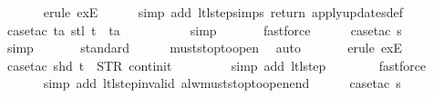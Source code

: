 \begin{isabellebody}
\ \ \ \ \ \isamarkupfalse%
\ {\isacharparenleft}erule\ exE{\isacharparenright}{\isacharplus}\isanewline
\ \ \ \ \isamarkupfalse%
\ {\isacharparenleft}simp\ add{\isacharcolon}\ ltl{\isacharunderscore}step{\isachardot}simps\ return\ apply{\isacharunderscore}updates{\isacharunderscore}def{\isacharparenright}\isanewline
\ \ \ \ \isamarkupfalse%
\ {\isacharparenleft}case{\isacharunderscore}tac\ {\isachardoublequoteopen}{\isasymexists}ta{\isachardot}\ stl\ t\ {\isacharequal}\ ta{\isachardoublequoteclose}{\isacharparenright}\isanewline
\ \ \ \ \ \ \isamarkupfalse%
\ {}\ \isamarkupfalse%
\ simp\isanewline
\ \ \ \ \ \isamarkupfalse%
\ fastforce\isanewline
\isanewline
\ \ \ \ \isamarkupfalse%
\ {\isacharparenleft}case{\isacharunderscore}tac\ {\isachardoublequoteopen}s\ {\isacharequal}\ {}{\isachardoublequoteclose}{\isacharparenright}\isanewline
\ \ \ \ \ \isamarkupfalse%
\ simp\isanewline
\ \ \ \ \ \isamarkupfalse%
\ standard\isanewline
\ \ \ \ \isamarkupfalse%
\ must{\isacharunderscore}stop{\isacharunderscore}to{\isacharunderscore}open\ \isamarkupfalse%
\ auto{\isacharbrackleft}{}{\isacharbrackright}\isanewline
\ \ \ \ \ \isamarkupfalse%
\ {\isacharparenleft}erule\ exE{\isacharparenright}{\isacharplus}\isanewline
\ \ \ \ \ \isamarkupfalse%
\ {\isacharparenleft}case{\isacharunderscore}tac\ {\isachardoublequoteopen}shd\ t\ {\isacharequal}\ {\isacharparenleft}STR\ {\isacharprime}{\isacharprime}continit{\isacharprime}{\isacharprime}{\isacharcomma}\ {\isacharbrackleft}{\isacharbrackright}{\isacharparenright}{\isachardoublequoteclose}{\isacharparenright}\isanewline
\ \ \ \ \ \ \isamarkupfalse%
\ {\isacharparenleft}simp\ add{\isacharcolon}\ ltl{\isacharunderscore}step{\isacharunderscore}{}{\isacharparenright}\isanewline
\ \ \ \ \ \ \isamarkupfalse%
\ fastforce\isanewline
\ \ \ \ \ \isamarkupfalse%
\ {\isacharparenleft}simp\ add{\isacharcolon}\ ltl{\isacharunderscore}step{\isacharunderscore}{}{\isacharunderscore}invalid\ alw{\isacharunderscore}must{\isacharunderscore}stop{\isacharunderscore}to{\isacharunderscore}open{\isacharunderscore}end{\isacharparenright}\isanewline
\isanewline
\ \ \ \ \isamarkupfalse%
\ {\isacharparenleft}case{\isacharunderscore}tac\ {\isachardoublequoteopen}s\ {\isasymin}\ {\isacharbraceleft}{}{\isacharcomma}\ {}{\isacharcomma}\ {}{\isacharcomma}\ {}{\isacharbraceright}{\isachardoublequoteclose}{\isacharparenright}\isanewline

\end{isabellebody}
